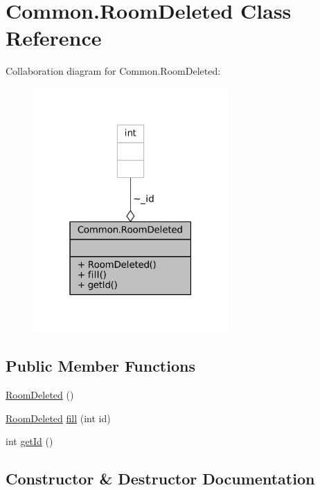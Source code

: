 \hypertarget{classCommon_1_1RoomDeleted}{}\section{Common.\+Room\+Deleted Class Reference}
\label{classCommon_1_1RoomDeleted}


Collaboration diagram for Common.\+Room\+Deleted\+:
\nopagebreak
\begin{figure}[H]
\begin{center}
\leavevmode
\includegraphics[width=211pt]{classCommon_1_1RoomDeleted__coll__graph}
\end{center}
\end{figure}
\subsection*{Public Member Functions}
\begin{DoxyCompactItemize}
\item 
\mbox{\hyperlink{classCommon_1_1RoomDeleted_ad4bb054370ba5dcb2296790d079d6884}{Room\+Deleted}} ()
\item 
\mbox{\hyperlink{classCommon_1_1RoomDeleted}{Room\+Deleted}} \mbox{\hyperlink{classCommon_1_1RoomDeleted_ab5c2f4c0eb47d43c35bdd9a44a448c8c}{fill}} (int id)
\item 
int \mbox{\hyperlink{classCommon_1_1RoomDeleted_a1c44d88d0acfd24f2a37a01205b27d94}{get\+Id}} ()
\end{DoxyCompactItemize}


\subsection{Constructor \& Destructor Documentation}
\mbox{\label{classCommon_1_1RoomDeleted_ad4bb054370ba5dcb2296790d079d6884}} 
